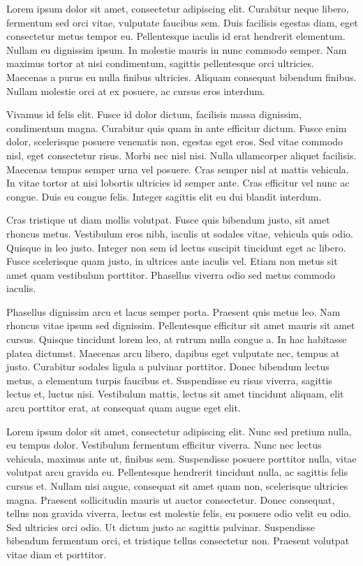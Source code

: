 Lorem ipsum dolor sit amet, consectetur adipiscing elit. Curabitur neque libero, fermentum sed orci vitae, vulputate faucibus sem. Duis facilisis egestas diam, eget consectetur metus tempor eu. Pellentesque iaculis id erat hendrerit elementum. Nullam eu dignissim ipsum. In molestie mauris in nunc commodo semper. Nam maximus tortor at nisi condimentum, sagittis pellentesque orci ultricies. Maecenas a purus eu nulla finibus ultricies. Aliquam consequat bibendum finibus. Nullam molestie orci at ex posuere, ac cursus eros interdum.

Vivamus id felis elit. Fusce id dolor dictum, facilisis massa dignissim, condimentum magna. Curabitur quis quam in ante efficitur dictum. Fusce enim dolor, scelerisque posuere venenatis non, egestas eget eros. Sed vitae commodo nisl, eget consectetur risus. Morbi nec nisl nisi. Nulla ullamcorper aliquet facilisis. Maecenas tempus semper urna vel posuere. Cras semper nisl at mattis vehicula. In vitae tortor at nisi lobortis ultricies id semper ante. Cras efficitur vel nunc ac congue. Duis eu congue felis. Integer sagittis elit eu dui blandit interdum.

Cras tristique ut diam mollis volutpat. Fusce quis bibendum justo, sit amet rhoncus metus. Vestibulum eros nibh, iaculis ut sodales vitae, vehicula quis odio. Quisque in leo justo. Integer non sem id lectus suscipit tincidunt eget ac libero. Fusce scelerisque quam justo, in ultrices ante iaculis vel. Etiam non metus sit amet quam vestibulum porttitor. Phasellus viverra odio sed metus commodo iaculis.

Phasellus dignissim arcu et lacus semper porta. Praesent quis metus leo. Nam rhoncus vitae ipsum sed dignissim. Pellentesque efficitur sit amet mauris sit amet cursus. Quisque tincidunt lorem leo, at rutrum nulla congue a. In hac habitasse platea dictumst. Maecenas arcu libero, dapibus eget vulputate nec, tempus at justo. Curabitur sodales ligula a pulvinar porttitor. Donec bibendum lectus metus, a elementum turpis faucibus et. Suspendisse eu risus viverra, sagittis lectus et, luctus nisi. Vestibulum mattis, lectus sit amet tincidunt aliquam, elit arcu porttitor erat, at consequat quam augue eget elit.

Lorem ipsum dolor sit amet, consectetur adipiscing elit. Nunc sed pretium nulla, eu tempus dolor. Vestibulum fermentum efficitur viverra. Nunc nec lectus vehicula, maximus ante ut, finibus sem. Suspendisse posuere porttitor nulla, vitae volutpat arcu gravida eu. Pellentesque hendrerit tincidunt nulla, ac sagittis felis cursus et. Nullam nisi augue, consequat sit amet quam non, scelerisque ultricies magna. Praesent sollicitudin mauris ut auctor consectetur. Donec consequat, tellus non gravida viverra, lectus est molestie felis, eu posuere odio velit eu odio. Sed ultricies orci odio. Ut dictum justo ac sagittis pulvinar. Suspendisse bibendum fermentum orci, et tristique tellus consectetur non. Praesent volutpat vitae diam et porttitor. 
